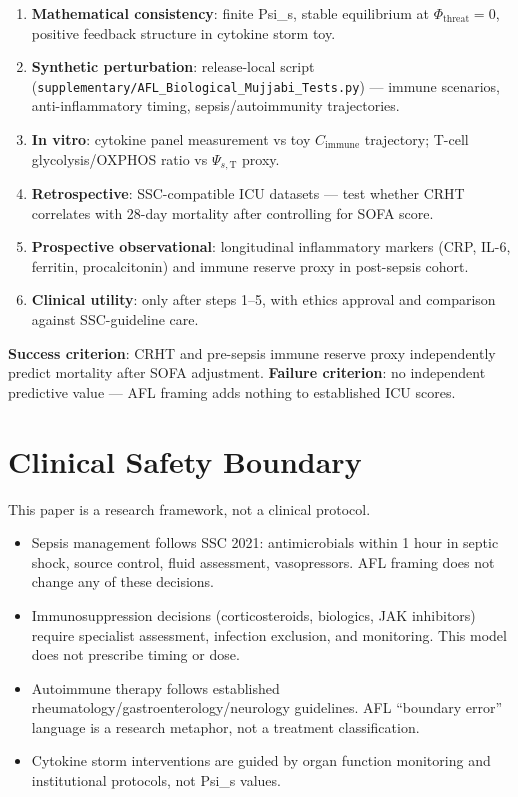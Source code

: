 \documentclass[12pt,a4paper]{article}
\begin{document}
\begin{enumerate}
    \item \textbf{Mathematical consistency}: finite Psi\_s, stable equilibrium at $\Phi_{\mathrm{threat}} = 0$, positive feedback structure in cytokine storm toy.
    \item \textbf{Synthetic perturbation}: release-local script (\texttt{supplementary/AFL\_Biological\_Mujjabi\_Tests.py}) — immune scenarios, anti-inflammatory timing, sepsis/autoimmunity trajectories.
    \item \textbf{In vitro}: cytokine panel measurement vs toy $C_{\mathrm{immune}}$ trajectory; T-cell glycolysis/OXPHOS ratio vs $\Psi_{s,\mathrm{T}}$ proxy.
    \item \textbf{Retrospective}: SSC-compatible ICU datasets — test whether CRHT correlates with 28-day mortality after controlling for SOFA score.
    \item \textbf{Prospective observational}: longitudinal inflammatory markers (CRP, IL-6, ferritin, procalcitonin) and immune reserve proxy in post-sepsis cohort.
    \item \textbf{Clinical utility}: only after steps 1--5, with ethics approval and comparison against SSC-guideline care.
\end{enumerate}

\textbf{Success criterion}: CRHT and pre-sepsis immune reserve proxy independently predict mortality after SOFA adjustment. \textbf{Failure criterion}: no independent predictive value — AFL framing adds nothing to established ICU scores.

\section{Clinical Safety Boundary}

This paper is a research framework, not a clinical protocol.
\begin{itemize}
    \item Sepsis management follows SSC 2021: antimicrobials within 1 hour in septic shock, source control, fluid assessment, vasopressors. AFL framing does not change any of these decisions.
    \item Immunosuppression decisions (corticosteroids, biologics, JAK inhibitors) require specialist assessment, infection exclusion, and monitoring. This model does not prescribe timing or dose.
    \item Autoimmune therapy follows established rheumatology/gastroenterology/neurology guidelines. AFL ``boundary error'' language is a research metaphor, not a treatment classification.
    \item Cytokine storm interventions are guided by organ function monitoring and institutional protocols, not Psi\_s values.
\end{itemize}
\end{document}

